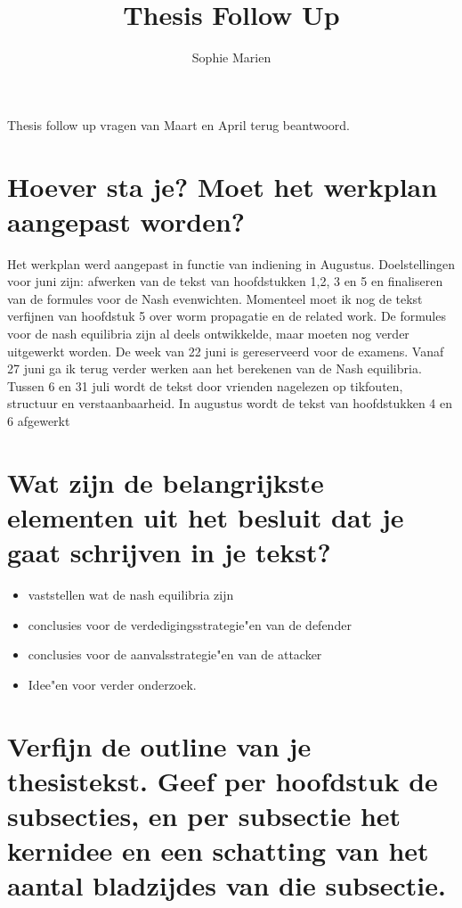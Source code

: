 \documentclass[a4paper, 11pt]{article}
\begin{document}
\begin{titlepage}
\title{Thesis Follow Up}
\author{Sophie Marien}
\date{} 
\end{titlepage}



\maketitle


Thesis follow up vragen van Maart en April terug beantwoord. 
\section{Hoever sta je? Moet het werkplan aangepast worden?}
Het werkplan werd aangepast in functie van indiening in Augustus. Doelstellingen voor juni zijn: afwerken van de tekst van hoofdstukken 1,2, 3 en 5 en finaliseren van de formules voor de Nash evenwichten.  Momenteel moet ik nog de tekst verfijnen van hoofdstuk 5 over worm propagatie en de related work. De formules voor de nash equilibria zijn al deels ontwikkelde, maar moeten nog verder uitgewerkt worden. De week van 22 juni is gereserveerd voor de examens. Vanaf 27 juni ga ik terug verder werken aan het berekenen van de Nash equilibria.  Tussen 6 en 31 juli wordt de tekst door vrienden nagelezen op tikfouten, structuur en verstaanbaarheid. In augustus wordt de tekst van hoofdstukken 4 en 6 afgewerkt 
\section{Wat zijn de belangrijkste elementen uit het besluit dat je gaat schrijven in je tekst?}
\begin{itemize}
\item vaststellen wat de nash equilibria zijn
\item conclusies voor de verdedigingsstrategie"en van de defender
\item conclusies voor de aanvalsstrategie"en van de attacker
\item Idee"en voor verder onderzoek. 
\end{itemize}

\section{Verfijn de outline van je thesistekst. Geef per hoofdstuk de subsecties, en per subsectie het kernidee en een schatting van het aantal bladzijdes van die subsectie.}
\end{document}
